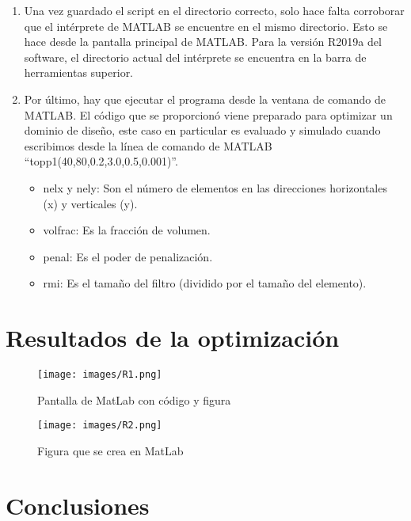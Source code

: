 \documentclass{article}
\begin{document}
\begin{enumerate}
\item   Una vez guardado el script en el directorio correcto, solo hace falta corroborar que el intérprete de MATLAB se encuentre en el mismo directorio. Esto se hace desde la pantalla principal de MATLAB. Para la versión R2019a del software, el directorio actual del intérprete se encuentra en la barra de herramientas superior.



\item   Por último, hay que ejecutar el programa desde la ventana de comando de MATLAB. El código que se proporcionó viene preparado para optimizar un dominio de diseño, este caso en particular es evaluado y simulado cuando escribimos desde la línea de comando de MATLAB “topp1(40,80,0.2,3.0,0.5,0.001)”.
\begin{itemize}
  \item nelx y nely: Son el número de elementos en las direcciones horizontales (x) y verticales (y). 
   \item	volfrac: Es la fracción de volumen. 
   \item	penal: Es el poder de penalización. 
   \item	rmi: Es el tamaño del filtro (dividido por el tamaño del elemento).
\end{itemize}

\end{enumerate}

\newpage

\section{Resultados de la optimización}

\begin{figure}[h] %
    \centering
    \texttt{[image: images/R1.png]} %
    \caption{Pantalla de MatLab con c\'{o}digo y figura}
\end{figure}



\begin{figure}[h] %
    \centering
    \texttt{[image: images/R2.png]} %
    \caption{Figura que se crea en MatLab}
\end{figure}

\newpage
\newpage

\section{Conclusiones}
\end{document}
